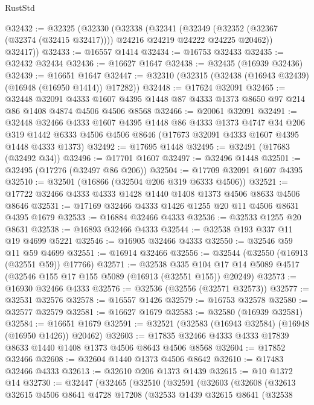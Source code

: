 \begin{lexlean}{RustStd}
\begin{coremodule}
@32432 := @32325
    (@32330
      (@32338
        (@32341
          (@32349 (@32352 (@32367 (@32374 (@32415 @32417)))) @24216 @24219 @24222 @24225 @20462))
        @32417))
@32433 := @16557 @1414
@32434 := @16753 @32433
@32435 := @32432 @32434
@32436 := @16627 @1647
@32438 := @32435 (@16939 @32436)
@32439 := @16651 @1647
@32447 := @32310 (@32315 (@32438 (@16943 @32439) (@16948 (@16950 @1414)) @17282))
@32448 := @17624 @32091
@32465 := @32448
    @32091
    @4333
    @1607
    @4395
    @1448
    @87
    @4333
    @1373
    @8650
    @97
    @214
    @86
    @1408
    @4874
    @4506
    @4506
    @8568
@32466 := @20061 @32091
@32491 := @32448
    @32466
    @4333
    @1607
    @4395
    @1448
    @86
    @4333
    @1373
    @4747
    @34
    @206
    @319
    @1442
    @6333
    @4506
    @4506
    @8646
    (@17673 @32091 @4333 @1607 @4395 @1448 @4333 @1373)
@32492 := @17695 @1448
@32495 := @32491 (@17683 (@32492 @34))
@32496 := @17701 @1607
@32497 := @32496 @1448
@32501 := @32495 (@17276 (@32497 @86 @206))
@32504 := @17709 @32091 @1607 @4395
@32510 := @32501 (@16866 (@32504 @206 @319 @6333 @4506))
@32521 := @17722 @32466 @4333 @4333 @1428 @1440 @1408 @1373 @4506 @8633 @4506 @8646
@32531 := @17169 @32466 @4333 @1426 @1255 @20 @11 @4506 @8631 @4395 @1679
@32533 := @16884 @32466 @4333
@32536 := @32533 @1255 @20 @8631
@32538 := @16893 @32466 @4333
@32544 := @32538 @193 @337 @11 @19 @4699 @5221
@32546 := @16905 @32466 @4333
@32550 := @32546 @59 @11 @59 @4699
@32551 := @16914 @32466
@32556 := @32544 (@32550 (@16913 (@32551 @59)) @17766)
@32571 := @32538
    @335
    @104
    @17
    @14
    @5089
    @4517
    (@32546 @155 @17 @155 @5089 (@16913 (@32551 @155)) @20249)
@32573 := @16930 @32466 @4333
@32576 := @32536 (@32556 (@32571 @32573))
@32577 := @32531 @32576
@32578 := @16557 @1426
@32579 := @16753 @32578
@32580 := @32577 @32579
@32581 := @16627 @1679
@32583 := @32580 (@16939 @32581)
@32584 := @16651 @1679
@32591 := @32521 (@32583 (@16943 @32584) (@16948 (@16950 @1426)) @20462)
@32603 := @17835 @32466 @4333 @4333 @17839 @8633 @1440 @1408 @1373 @4506 @8643 @4506 @8568
@32604 := @17852 @32466
@32608 := @32604 @1440 @1373 @4506 @8642
@32610 := @17483 @32466 @4333
@32613 := @32610 @206 @1373 @1439
@32615 := @10 @1372 @14
@32730 := @32447
    (@32465
      (@32510
        (@32591
          (@32603
            (@32608
              (@32613
                @32615
                @4506
                @8641
                @4728
                @17208
                (@32533
                  @1439
                  @32615
                  @8641
                  (@32538

\end{coremodule}
\end{lexlean}
